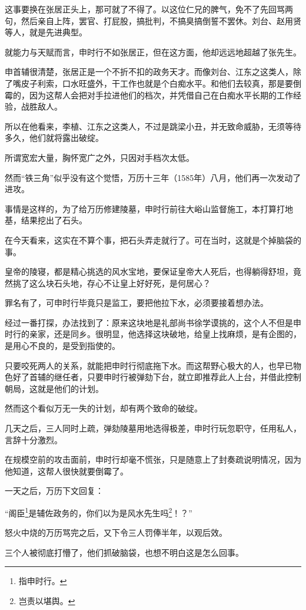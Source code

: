 \begin{multicols}{\theparacolNo}
这事要换在张居正头上，那可就了不得了。以这位仁兄的脾气，免不了先回骂两句，然后亲自上阵，罢官、打屁股，搞批判，不搞臭搞倒誓不罢休。刘台、赵用贤等人，就是先进典型。

就能力与天赋而言，申时行不如张居正，但在这方面，他却远远地超越了张先生。

申首辅很清楚，张居正是一个不折不扣的政务天才。而像刘台、江东之这类人，除了嘴皮子利索，口水旺盛外，干工作也就是个白痴水平。和他们去较真，那是要倒霉的，因为这帮人会把对手拉进他们的档次，并凭借自己在白痴水平长期的工作经验，战胜敌人。

所以在他看来，李植、江东之这类人，不过是跳梁小丑，并无致命威胁，无须等待多久，他们就将露出破绽。

所谓宽宏大量，胸怀宽广之外，只因对手档次太低。

然而“铁三角”似乎没有这个觉悟，万历十三年（1585年）八月，他们再一次发动了进攻。

事情是这样的，为了给万历修建陵墓，申时行前往大峪山监督施工，本打算打地基，结果挖出了石头。

在今天看来，这实在不算个事，把石头弄走就行了。可在当时，这就是个掉脑袋的事。

皇帝的陵寝，都是精心挑选的风水宝地，要保证皇帝大人死后，也得躺得舒坦，竟然挑了这么块石头地，存心不让皇上好好死，是何居心？

罪名有了，可申时行毕竟只是监工，要把他拉下水，必须要接着想办法。

经过一番打探，办法找到了：原来这块地是礼部尚书徐学谟挑的，这个人不但是申时行的亲家，还是同乡。很明显，他选择这块破地，给皇上找麻烦，是有企图的，是用心不良的，是受到指使的。

只要咬死两人的关系，就能把申时行彻底拖下水。而这帮野心极大的人，也早已物色好了首辅的继任者，只要申时行被弹劾下台，就立即推荐此人上台，并借此控制朝局，这就是他们的计划。

然而这个看似万无一失的计划，却有两个致命的破绽。

几天之后，三人同时上疏，弹劾陵墓用地选得极差，申时行玩忽职守，任用私人，言辞十分激烈。

在规模空前的攻击面前，申时行却毫不慌张，只是随意上了封奏疏说明情况，因为他知道，这帮人很快就要倒霉了。

一天之后，万历下文回复：

“阁臣\footnote{指申时行。}是辅佐政务的，你们以为是风水先生吗\footnote{岂责以堪舆。}！？”

怒火中烧的万历骂完之后，又下令三人罚俸半年，以观后效。

三个人被彻底打懵了，他们抓破脑袋，也想不明白这是怎么回事。


\end{multicols}
